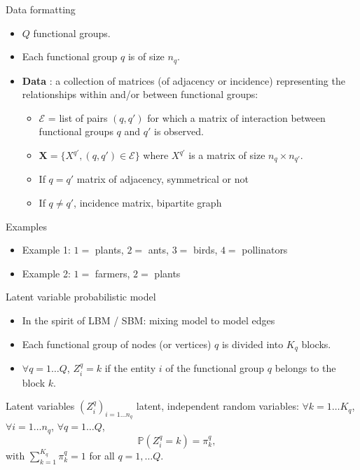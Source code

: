 \documentclass[compress,10pt]{beamer}
\newcommand{\bX}{\boldsymbol{X}}
\def \P{\mathbb{P}}
\begin{document}
\begin{frame}{Data formatting}
\begin{itemize}
\item $Q$ functional groups. 
\item Each functional group $q$ is of size $n_q$. 
\item \textbf{Data} : a collection of matrices (of adjacency or incidence) representing the relationships within and/or between functional groups: 
\begin{itemize}
\item $\mathcal{E}$ = list of pairs $(q,q')$ for which a matrix of interaction between functional groups $q$ and $q'$ is observed. 
\item $\bX = \{X^{q'}, (q,q') \in \mathcal{E}\}$ where $X^{q'}$ is a matrix of size $n_q \times n_{q'}$. 
\item If $q=q'$ matrix of adjacency, symmetrical or not
\item If $q \neq q'$, incidence matrix, bipartite graph
\end{itemize}
\end{itemize}

\begin{block}{Examples}
\begin{itemize}
\item Example 1: $1 =$ plants, $2=$ ants, $3=$ birds, $4=$ pollinators

\item Example 2: $1 =$ farmers, $2=$ plants 
  
\end{itemize}
\end{block}
\end{frame}



\begin{frame}{Latent variable probabilistic model}

\begin{itemize}
\item In the spirit of LBM / SBM: mixing model to model edges
\item Each functional group of nodes (or vertices) $q$ is divided into $K_q$ blocks.  
\item $\forall q=1\dots Q$, $Z^q_i=k$ if the entity $i$ of the functional group $q$ belongs to the block $k$. 
\end{itemize}
 

\begin{block}{Latent variables}
 $(Z^q_i)_{i=1\dots n_q}$ latent, independent random variables: $ \forall k=1\dots K_q$, $\forall i=1\dots n_q$, $ \forall q=1\dots Q$, \begin{equation}\label{eq:mod2}
\P(Z^{q}_i=k) = \pi^{q}_k, \quad
\end{equation}
with $\sum_{k=1}^{K_q}\pi^{q}_k=1$ for all $q=1, \dots Q$.
\end{block}

\end{frame}
\end{document}
